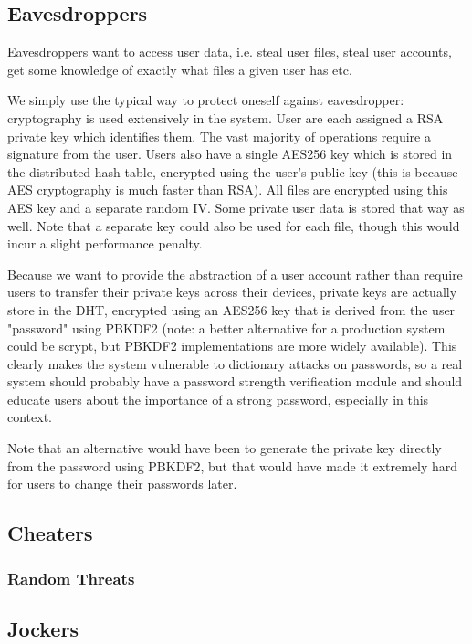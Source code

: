 \documentclass{acm_proc_article-sp}
\begin{document}
\subsection{Eavesdroppers}

Eavesdroppers want to access user data, i.e. steal user files, steal user accounts, get some knowledge of exactly what files a given user has etc.

We simply use the typical way to protect oneself against eavesdropper: cryptography is used extensively in the system. User are each assigned a RSA private key which identifies them. The vast majority of operations require a signature from the user. Users also have a single AES256 key which is stored in the distributed hash table, encrypted using the user's public key (this is because AES cryptography is much faster than RSA). All files are encrypted using this AES key and a separate random IV. Some private user data is stored that way as well. Note that a separate key could also be used for each file, though this would incur a slight performance penalty.

Because we want to provide the abstraction of a user account rather than require users to transfer their private keys across their devices, private keys are actually store in the DHT, encrypted using an AES256 key that is derived from the user "password" using PBKDF2\cite{PBKDF2} (note: a better alternative for a production system could be scrypt\cite{scrypt}, but PBKDF2 implementations are more widely available). This clearly makes the system vulnerable to dictionary attacks on passwords, so a real system should probably have a password strength verification module and should educate users about the importance of a strong password, especially in this context.

Note that an alternative would have been to generate the private key directly from the password using PBKDF2, but that would have made it extremely hard for users to change their passwords later.

\subsection{Cheaters}

\subsubsection{Random Threats}

\subsection{Jockers}
\end{document}
